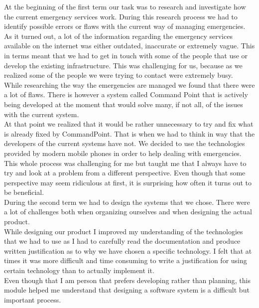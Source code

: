 \documentclass[]{article}
\begin{document}
At the beginning of the first term our task was to research and investigate how the current emergency services work. During this research process we had to identify possible errors or flaws with the current way of managing emergencies.\\ 

As it turned out, a lot of the information regarding the emergency services available on the internet was either outdated, inaccurate or extremely vague. This in terms meant that we had to get in touch with some of the people that use or develop the existing infrastructure. This was challenging for us, because as we realized some of the people we were trying to contact were extremely busy.\\

While researching the way the emergencies are managed we found that there were a lot of flaws. There is however a system called Command Point that is actively being developed at the moment that would solve many, if not all, of the issues with the current system.\\

At that point we realized that it would be rather unnecessary to try and fix what is already fixed by CommandPoint. That is when we had to think in way that the developers of the current systems have not.  We decided to use the technologies provided by modern mobile phones in order to help dealing with emergencies.\\

This whole process was challenging for me but taught me that I always have to try and look at a problem from a different perspective. Even though that some perspective may seem ridiculous at first, it is surprising how often it turns out to be beneficial.\\

During the second term we had to design the systems that we chose. There were a lot of challenges both when organizing ourselves and when designing the actual product. \\

While designing our product I improved my understanding of the technologies that we had to use as I had to carefully read the documentation and produce written justification as to why we have chosen a specific technology. I felt that at times it was more difficult and time consuming to write a justification for using certain technology than to actually implement it.\\

Even though that I am person that prefers developing rather than planning, this module helped me understand that designing a software system is a difficult but important process.\\
\end{document}
